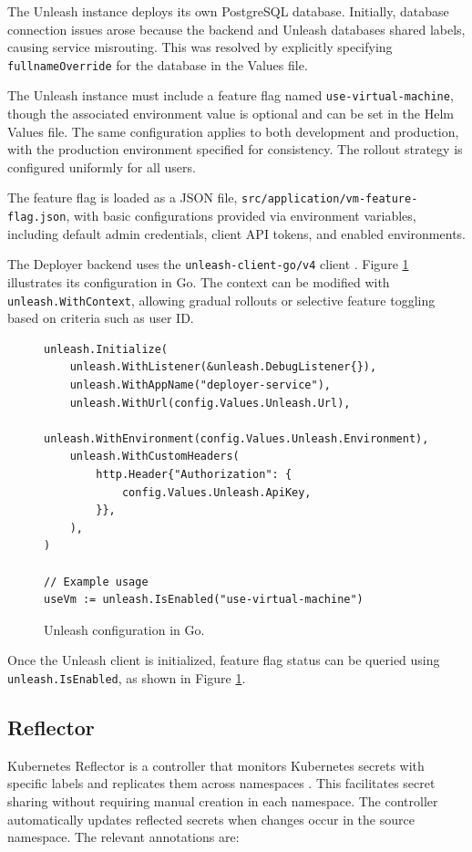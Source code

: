 The Unleash instance deploys its own PostgreSQL database. Initially, database connection issues arose because the backend and Unleash databases shared labels, causing service misrouting. This was resolved by explicitly specifying \texttt{fullnameOverride} for the database in the Values file.

The Unleash instance must include a feature flag named \texttt{use-virtual-machine}, though the associated environment value is optional and can be set in the Helm Values file. The same configuration applies to both development and production, with the production environment specified for consistency. The rollout strategy is configured uniformly for all users.

The feature flag is loaded as a JSON file, \texttt{src/application/vm-feature-flag\allowbreak.json}, with basic configurations provided via environment variables, including default admin credentials, client API tokens, and enabled environments.

The Deployer backend uses the \texttt{unleash-client-go/v4} client \parencite{unleash_client_go}. Figure \ref{fig:unleash_config} illustrates its configuration in Go. The context can be modified with \texttt{unleash\allowbreak.WithContext}, allowing gradual rollouts or selective feature toggling based on criteria such as user ID.

\begin{figure}[h]
    \centering
\begin{verbatim}
unleash.Initialize(
    unleash.WithListener(&unleash.DebugListener{}),
    unleash.WithAppName("deployer-service"),
    unleash.WithUrl(config.Values.Unleash.Url),
    unleash.WithEnvironment(config.Values.Unleash.Environment),
    unleash.WithCustomHeaders(
        http.Header{"Authorization": {
            config.Values.Unleash.ApiKey,
        }},
    ),
)

// Example usage
useVm := unleash.IsEnabled("use-virtual-machine")
\end{verbatim}
    \caption{Unleash configuration in Go.}
    \label{fig:unleash_config}
\end{figure}

Once the Unleash client is initialized, feature flag status can be queried using \texttt{unleash.IsEnabled}, as shown in Figure \ref{fig:unleash_config}.

\subsection{Reflector}
Kubernetes Reflector is a controller that monitors Kubernetes secrets with specific labels and replicates them across namespaces \parencite{kubernetes_reflector}. This facilitates secret sharing without requiring manual creation in each namespace. The controller automatically updates reflected secrets when changes occur in the source namespace. The relevant annotations are:

